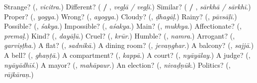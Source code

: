 \begin{tcolorbox}[breakable,colback=teal!4,colframe=teal!35!black,title={Before you move on}]
Strange? (\textbf{}, \emph{vicitra}.) Different? (\textbf{ / }, \emph{vegḷā / vegḷī}.) Similar? (\textbf{ / }, \emph{sārkhā / sārkhī}.) Proper? (\textbf{}, \emph{yogya}.) Wrong? (\textbf{}, \emph{ayogya}.) Cloudy? (\textbf{}, \emph{ḍhagāḷ}.) Rainy? (\textbf{}, \emph{pāvsāḷī}.) Possible? (\textbf{}, \emph{śakya}.) Impossible? (\textbf{}, \emph{aśakya}.) Main? (\textbf{}, \emph{mukhya}.) Affectionate? (\textbf{}, \emph{premaḷ}.) Kind? (\textbf{}, \emph{dayāḷū}.) Cruel? (\textbf{}, \emph{krūr}.) Humble? (\textbf{}, \emph{namra}.) Arrogant? (\textbf{}, \emph{garviṣṭha}.) A flat? (\textbf{}, \emph{sadnikā}.) A dining room? (\textbf{}, \emph{jevaṇghar}.) A balcony? (\textbf{}, \emph{sajjā}.) A bell? (\textbf{}, \emph{ghaṇṭā}.) A compartment? (\textbf{}, \emph{kappā}.) A court? (\textbf{}, \emph{nyāyālay}.) A judge? (\textbf{}, \emph{nyāyādhīś}.) A mayor? (\textbf{}, \emph{mahāpaur}.) An election? (\textbf{}, \emph{nivaḍṇūk}.) Politics? (\textbf{}, \emph{rājkāraṇ}.)
\end{tcolorbox}

